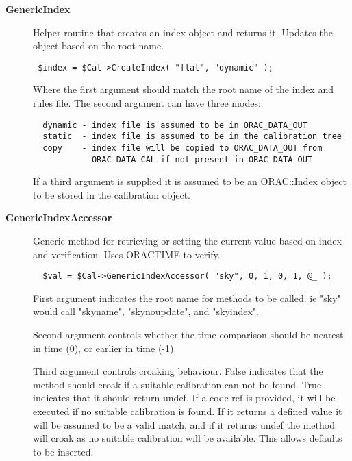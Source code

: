 \begin{description}

\item[{\textbf{GenericIndex}}] \mbox{}

Helper routine that creates an index object and returns it. Updates the
object based on the root name.

\begin{verbatim}
 $index = $Cal->CreateIndex( "flat", "dynamic" );
\end{verbatim}


Where the first argument should match the root name of the index and rules
file. The second argument can have three modes:

\begin{verbatim}
  dynamic - index file is assumed to be in ORAC_DATA_OUT
  static  - index file is assumed to be in the calibration tree
  copy    - index file will be copied to ORAC_DATA_OUT from
            ORAC_DATA_CAL if not present in ORAC_DATA_OUT
\end{verbatim}


If a third argument is supplied it is assumed to be an ORAC::Index
object to be stored in the calibration object.


\item[{\textbf{GenericIndexAccessor}}] \mbox{}

Generic method for retrieving or setting the current value based on index
and verification. Uses ORACTIME to verify.

\begin{verbatim}
  $val = $Cal->GenericIndexAccessor( "sky", 0, 1, 0, 1, @_ );
\end{verbatim}


First argument indicates the root name for methods to be called. ie "sky" would
call "skyname", "skynoupdate", and "skyindex".



Second argument controls whether the time comparison should be
nearest in time (0), or earlier in time (-1).



Third argument controls croaking behaviour. False indicates that the method
should croak if a suitable calibration can not be found. True indicates
that it should return undef. If a code ref is provided, it will be executed
if no suitable calibration is found. If it returns a defined value it
will be assumed to be a valid match, and if it returns undef the method
will croak as no suitable calibration will be available. This allows defaults
to be inserted.




\end{description}

